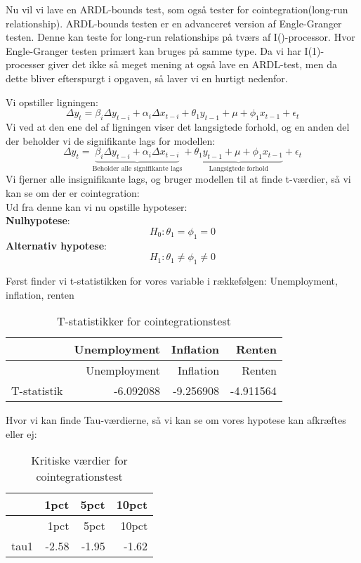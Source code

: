 \documentclass[
  10pt,
]{article}
\begin{document}
\leavevmode

Nu vil vi lave en ARDL-bounds test, som også tester for
cointegration(long-run relationship). ARDL-bounds testen er en
advanceret version af Engle-Granger testen. Denne kan teste for long-run
relationships på tværs af I()-processor. Hvor Engle-Granger testen
primært kan bruges på samme type. Da vi har I(1)-processer giver det
ikke så meget mening at også lave en ARDL-test, men da dette bliver
efterspurgt i opgaven, så laver vi en hurtigt nedenfor.

Vi opstiller ligningen:\\
\[\Delta y_t = \beta_i \Delta y_{t-i} + \alpha_i \Delta x_{t-i}  + \theta_1 y_{t-1} + \mu + \phi_1 x_{t-1} + \epsilon_t  \]
Vi ved at den ene del af ligningen viser det langsigtede forhold, og en
anden del der beholder vi de signifikante lags for modellen:\\
\[\Delta y_t = \underbrace{\beta_i \Delta y_{t-i} + \alpha_i \Delta x_{t-i}}_\text{Beholder alle signifikante lags}  + \underbrace{\theta_1 y_{t-1} + \mu + \phi_1 x_{t-1}}_\text{Langsigtede forhold} + \epsilon_t  \]
Vi fjerner alle insignifikante lags, og bruger modellen til at finde
t-værdier, så vi kan se om der er cointegration:\\

Ud fra denne kan vi nu opstille hypoteser:\\
\textbf{Nulhypotese}: \[H_0:\theta_1=\phi_1=0 \tag{No cointegration}\]
\textbf{Alternativ hypotese}:
\[H_1:\theta_1\neq\phi_1\neq0 \tag{Cointegration}\]

Først finder vi t-statistikken for vores variable i rækkefølgen:
Unemployment, inflation, renten

\begin{longtable}[]{@{}lrrr@{}}
\caption{T-statistikker for cointegrationstest}\tabularnewline
\toprule
& Unemployment & Inflation & Renten\tabularnewline
\midrule
\endfirsthead
\toprule
& Unemployment & Inflation & Renten\tabularnewline
\midrule
\endhead
T-statistik & -6.092088 & -9.256908 & -4.911564\tabularnewline
\bottomrule
\end{longtable}

Hvor vi kan finde Tau-værdierne, så vi kan se om vores hypotese kan
afkræftes eller ej:

\begin{longtable}[]{@{}lrrr@{}}
\caption{Kritiske værdier for cointegrationstest}\tabularnewline
\toprule
& 1pct & 5pct & 10pct\tabularnewline
\midrule
\endfirsthead
\toprule
& 1pct & 5pct & 10pct\tabularnewline
\midrule
\endhead
tau1 & -2.58 & -1.95 & -1.62\tabularnewline
\bottomrule
\end{longtable}
\end{document}

